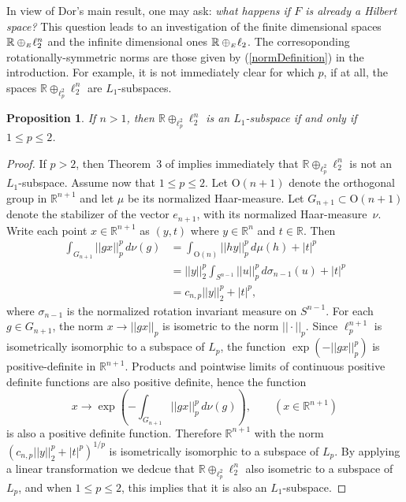 \documentclass{article}[1100]
\newtheorem{proposition}[theorem]{Proposition}
\theoremstyle{definition}
\theoremstyle{remark}
\newcommand\Ren[1]{\mathbb{R}^{#1}}
\newcommand\ar{\mathbb{R}}
\newcommand\norma[1]{|\!|#1|\!|}
\newcommand\sphere[1]{S^{#1}}
\newcommand\directSum[1]{\ar\oplus_{\scriptscriptstyle E}\mkern-3mu#1}
\begin{document}
 In view of Dor's main result, one may ask: \emph{what happens if $F$ is already a Hilbert space?} 
This question leads  to an investigation of the finite dimensional spaces $\directSum{\ell_2^n}$ and the infinite dimensional ones $\directSum{\ell_2}$. The corresoponding rotationally-symmetric norms are those given by (\ref{normDefinition}) in the introduction. For example, it is not immediately clear for which $p$, if at all,  the spaces $\ar\oplus_{\ell_p^2}\ell_2^n$ are $L_1$-subspaces. 
\begin{tcolorbox}
\begin{proposition} If $n>1$, then $\ar\oplus_{\ell_p^2}\ell_2^n$ is an $L_1$-subspace if and only if $1\leq p\leq 2$.
\end{proposition}
\end{tcolorbox}
\begin{proof}
If $p>2$, then Theorem~$3$ of \cite{KoldLonke} implies immediately that $\ar\oplus_{\ell_p^2}\ell_2^n$  is not an $L_1$-subspace. Assume now that $1\leq p\leq 2$. Let $\text{O}(n+1)$ denote the orthogonal group in $\Ren{n+1}$ and let
$\mu$ be its normalized Haar-measure. Let $G_{n+1}\subset \text{O}(n+1)$ denote the stabilizer of the vector $e_{n+1}$, with its normalized Haar-measure~$\nu$. Write each point $x\in\Ren{n+1}$ as $(y,t)$ where
$y\in\Ren{n}$ and $t\in\ar$. Then
\[
\begin{aligned}
\int_{G_{n+1}}\norma{gx}_p^p\,d\nu(g)&=\int_{\text{O}(n)}\norma{hy}_p^p\,d\mu(h)+|t|^p\\
&=\norma{y}_2^p\int_{\sphere{n-1}}\norma{u}_p^p\,d\sigma_{n-1}(u)+|t|^p\\
&=c_{n,p}\norma{y}_2^p+|t|^p,
\end{aligned}
\]
where $\sigma_{n-1}$ is the normalized rotation invariant measure on $\sphere{n-1}$. For each $g\in G_{n+1}$, the norm $x\to \norma{gx}_p$ is isometric to the norm $\norma{\cdot}_p$. Since
$\ell_p^{n+1}$ is isometrically isomorphic to a subspace of  $L_p$, the function $\exp(-\norma{gx}_p^p)$ is positive-definite in $\Ren{n+1}$. Products and pointwise limits of continuous positive definite functions are also 
positive definite, hence the function 
\[ x\to \exp(-\int_{G_{n+1}}\norma{gx}_p^p\,d\nu(g)),\qquad (x\in\Ren{n+1})\]
is also a positive definite function. Therefore $\Ren{n+1}$ with the norm $(c_{n,p}\norma{y}_2^p+|t|^p)^{1/p}$ is isometrically isomorphic to a subspace of $L_p$. By applying a linear
transformation we dedcue that $\ar\oplus_{\ell_p^2}\ell_2^n$  also isometric to a subspace of $L_p$, and when $1\leq p\leq 2$, this implies that it is also an $L_1$-subspace.
\end{proof}
\end{document}
